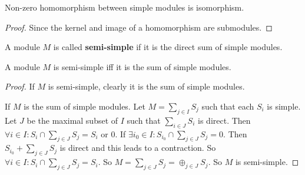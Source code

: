 \documentclass[12pt]{book}
\begin{document}
	\begin{lemma}[Schur]
		Non-zero homomorphism between simple modules is isomorphism.
	\end{lemma}
	\begin{proof}
		Since the kernel and image of a homomorphism are submodules.
	\end{proof}
	
	\begin{definition}
		A module $M$ is called {\bf semi-simple} if it is the direct sum of simple modules.
	\end{definition}
	
	\begin{theorem}
		A module $M$ is semi-simple iff it is the sum of simple modules.
	\end{theorem}
	\begin{proof}
		If $M$ is semi-simple, clearly it is the sum of simple modules.
	
		If $M$ is the sum of simple modules. Let $M=\sum_{j\in I} S_j$ such that each $S_i$ is simple. Let $J$ be the maximal subset of $I$ such that $\sum_{i\in J} S_i$ is direct. Then $\forall i\in I: S_i\cap \sum_{j\in J} S_j =S_i$ or 0. If $\exists i_0\in I: S_{i_0}\cap \sum_{j\in J} S_j =0$. Then $S_{i_0}+\sum_{j\in J} S_j$ is direct and this leads to a contraction. So $\forall i\in I: S_i\cap \sum_{j\in J} S_j =S_i$. So $M=\sum_{j\in J} S_j=\oplus_{j\in J} S_j$. So $M$ is semi-simple.   
	\end{proof}
	
\end{document}

